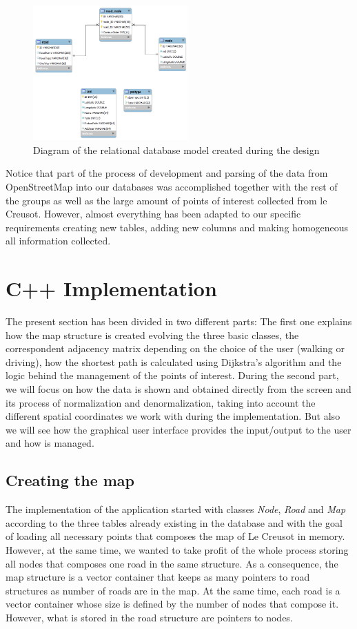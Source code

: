 \documentclass{article}
\begin{document}
\begin{figure}[h]
\centering
\includegraphics[width=0.53\textwidth]{big_schneider.png}
\caption{Diagram of the relational database model created during the design}
\label{fig:RelDBdiagram}
\end{figure}

Notice that part of the process of development and parsing of the data from OpenStreetMap into our databases was accomplished together with the rest of the groups as well as the large amount of points of interest collected from le Creusot. However, almost everything has been adapted to our specific requirements creating new tables, adding new columns and making homogeneous all information collected. 

\clearpage
\section{C++ Implementation}
The present section has been divided in two different parts: The first one explains how the map structure is created evolving the three basic classes, the correspondent adjacency matrix depending on the choice of the user (walking or driving), how the shortest path is calculated using Dijkstra's algorithm and the logic behind the management of the points of interest. During the second part, we will focus on how the data is shown and obtained directly from the screen and its process of normalization and denormalization, taking into account the different spatial coordinates we work with during the implementation. But also we will see how the graphical user interface provides the input/output to the user and how is managed.

\subsection{Creating the map}
The implementation of the application started with classes \textit{Node}, \textit{Road} and \textit{Map} according to the three tables already existing in the database and with the goal of loading all necessary points that composes the map of Le Creusot in memory. However, at the same time, we wanted to take profit of the whole process storing all nodes that composes one road in the same structure. As a consequence, the map structure is a vector container that keeps as many pointers to road structures as number of roads are in the map. At the same time, each road is a vector container whose size is defined by the number of nodes that compose it. However, what is stored in the road structure are pointers to nodes.
\end{document}
